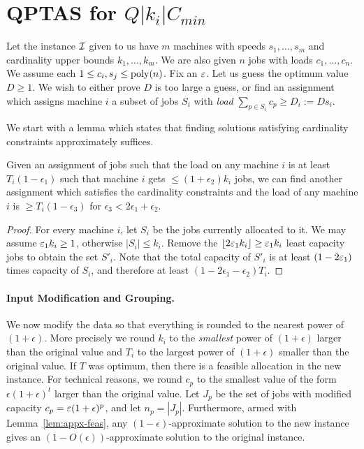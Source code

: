 \section{QPTAS for $Q|k_i|C_{min}$}
\def\pv{\mathbf{b}}
\newcommand{\dem}{\mathsf{cap}}
Let the instance ${\cal I}$ given to us have $m$ machines with speeds $s_1,\ldots, s_m$ and cardinality upper bounds $k_1,\ldots,k_m$. We are also given $n$ jobs with loads $c_1,\ldots,c_n$. We assume each $1\leq c_i,s_j \leq \mathrm{poly}(n)$.
Fix an $\varepsilon$. 
Let us guess the optimum value $D\geq 1$.  We wish to either prove $D$ is too large a guess, or find an assignment which assigns machine $i$ a subset of jobs $S_i$ with {\em load} $\sum_{p\in S_i} c_p \geq D_i := Ds_i$.


We start with a lemma which states that finding solutions satisfying cardinality constraints approximately suffices.
\begin{lemma}\label{lem:appx-feas}
	Given an assignment of jobs such that the load on any machine $i$  is at least $T_i(1 - \epsilon_1)$ such that machine $i$ gets $\leq (1+\epsilon_2)k_i$ jobs, 
	we can find another assignment which satisfies the cardinality constraints and the load of any machine $i$ is $\geq T_i(1 - \epsilon_3)$ for $\epsilon_3 < 2\epsilon_1+\epsilon_2$.
\end{lemma}
\begin{proof}
For every machine $i$, let $S_i$ be the jobs currently allocated to it. We may assume $\varepsilon_1 k_i \geq 1$, otherwise $|S_i| \leq k_i$.
Remove the $\lfloor2\varepsilon_1 k_i\rfloor \geq \varepsilon_1 k_i$ least capacity jobs to obtain the set $S'_i$. Note that the total capacity of $S'_i$ is at least $(1-2\varepsilon_1)$ times capacity of $S_i$, and therefore
at least $(1-2\epsilon_1 - \epsilon_2)T_i$. 
\end{proof}
\noindent
\paragraph{Input Modification and Grouping.}
We now modify the data so that everything is rounded to the nearest power of $(1+\epsilon)$. More precisely we round  $k_i$  to the {\em smallest} power of $(1+\epsilon)$ larger than the original value and $T_i$ to the largest power of $(1+\epsilon)$ smaller than the original value.
If $T$ was optimum, then there is a feasible allocation in the new instance. 
For technical reasons, we round $c_p$ to the smallest value of the form $\epsilon(1+\epsilon)^t$ larger than the original value.
Let $J_p$ be the set of jobs with modified capacity $c_p = \varepsilon (1+\epsilon)^p$, and let $n_p = |J_p|$. Furthermore, armed with Lemma~\ref{lem:appx-feas}, any $(1-\epsilon)$-approximate solution to the new instance gives an $(1-O(\epsilon))$-approximate solution to the original instance.  \smallskip


